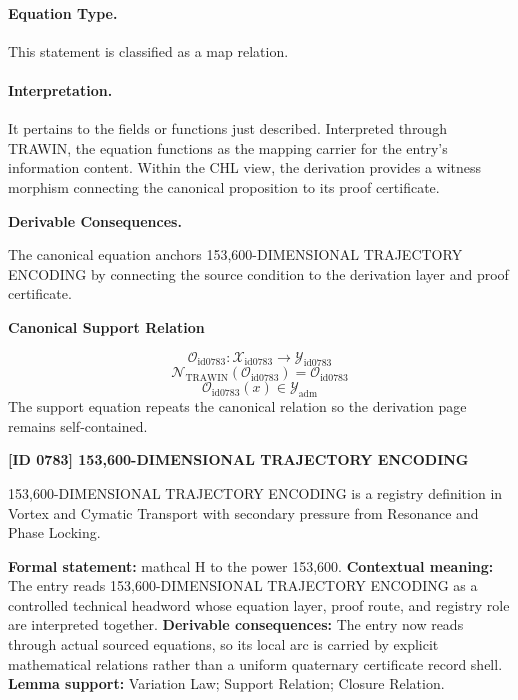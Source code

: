 \paragraph{Equation Type.}
This statement is classified as a map relation.

\paragraph{Interpretation.}
It pertains to the fields or functions just described. Interpreted through TRAWIN, the equation functions as the mapping carrier for the entry’s information content. Within the CHL view, the derivation provides a witness morphism connecting the canonical proposition to its proof certificate.

\par\vspace{0.35em}
\noindent\textbf{Derivable Consequences.}\quad
\begingroup
\footnotesize
\raggedright
The canonical equation anchors 153,600-DIMENSIONAL TRAJECTORY ENCODING by connecting the source condition to the derivation layer and proof certificate.
\par\endgroup

\noindent\textbf{Canonical Support Relation}\par
\[
\mathcal{O}_{\mathrm{id0783}}:\mathcal{X}_{\mathrm{id0783}}\longrightarrow\mathcal{Y}_{\mathrm{id0783}}
\]
\[
\mathcal{N}_{\mathrm{TRAWIN}}(\mathcal{O}_{\mathrm{id0783}})=\mathcal{O}_{\mathrm{id0783}}
\]
\[
\mathcal{O}_{\mathrm{id0783}}(x)\in\mathcal{Y}_{\mathrm{adm}}
\]
\noindent The support equation repeats the canonical relation so the derivation page remains self-contained.\par

\clearpage
\noindent\textbf{[ID 0783] 153,600-DIMENSIONAL TRAJECTORY ENCODING}\par
\vspace{0.35em}
\begingroup\small
{}
153,600-DIMENSIONAL TRAJECTORY ENCODING is a registry definition in Vortex and Cymatic Transport with secondary pressure from Resonance and Phase Locking.

\begingroup\footnotesize\setlength{\emergencystretch}{3em}\sloppy
\textbf{Formal statement:} mathcal H to the power 153,600. \textbf{Contextual meaning:} The entry reads 153,600-DIMENSIONAL TRAJECTORY ENCODING as a controlled technical headword whose equation layer, proof route, and registry role are interpreted together. \textbf{Derivable consequences:} The entry now reads through actual sourced equations, so its local arc is carried by explicit mathematical relations rather than a uniform quaternary certificate record shell. \textbf{Lemma support:} Variation Law; Support Relation; Closure Relation.\par
\endgroup

